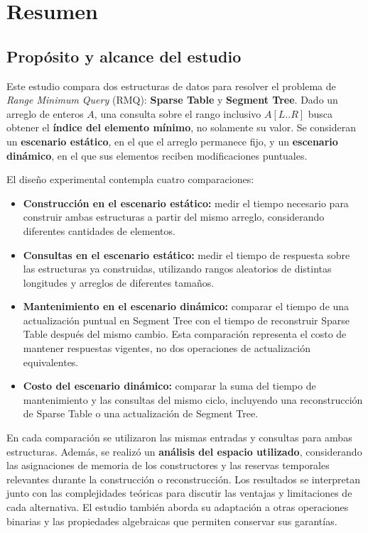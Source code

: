\section{Resumen}

\subsection{Propósito y alcance del estudio}

Este estudio compara dos estructuras de datos para resolver el problema de
\textit{Range Minimum Query} (RMQ): \textbf{Sparse Table} y
\textbf{Segment Tree}. Dado un arreglo de enteros \(A\), una consulta sobre
el rango inclusivo \(A[L..R]\) busca obtener el \textbf{índice del elemento
mínimo}, no solamente su valor. Se consideran un \textbf{escenario estático},
en el que el arreglo permanece fijo, y un \textbf{escenario dinámico},
en el que sus elementos reciben modificaciones puntuales.

El diseño experimental contempla cuatro comparaciones:
\begin{itemize}
    \item \textbf{Construcción en el escenario estático:} medir el tiempo
    necesario para construir ambas estructuras a partir del mismo arreglo,
    considerando diferentes cantidades de elementos.
    \item \textbf{Consultas en el escenario estático:} medir el tiempo de
    respuesta sobre las estructuras ya construidas, utilizando rangos
    aleatorios de distintas longitudes y arreglos de diferentes tamaños.
    \item \textbf{Mantenimiento en el escenario dinámico:} comparar el
    tiempo de una actualización puntual en Segment Tree con el tiempo de
    reconstruir Sparse Table después del mismo cambio. Esta comparación
    representa el costo de mantener respuestas vigentes, no dos operaciones
    de actualización equivalentes.
    \item \textbf{Costo del escenario dinámico:} comparar la suma del tiempo
    de mantenimiento y las consultas del mismo ciclo, incluyendo una
    reconstrucción de Sparse Table o una actualización de Segment Tree.
\end{itemize}

En cada comparación se utilizaron las mismas entradas y consultas para ambas
estructuras. Además, se realizó un \textbf{análisis del espacio utilizado},
considerando las asignaciones de memoria de los constructores y las reservas
temporales relevantes durante la construcción o reconstrucción. Los resultados
se interpretan junto con las complejidades teóricas para discutir las
ventajas y limitaciones de cada alternativa. El estudio también aborda su
adaptación a otras operaciones binarias y las propiedades algebraicas que
permiten conservar sus garantías.

